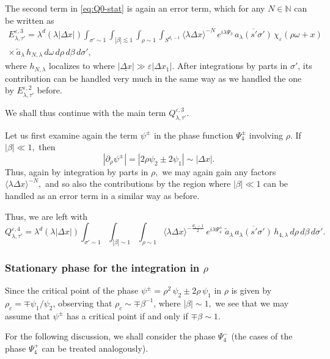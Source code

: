 \documentclass[leqno]{amsart}
\theoremstyle{definition}
\theoremstyle{remark}
\numberwithin{equation}{section}
\newcommand{\N}{\mathbb{N}}
\newcommand{\jp}[1]{\langle{#1}\rangle}
\newcommand\la{{\lambda}}
\newcommand\ve{{\varepsilon}}
\begin{document}
The second term in \eqref{eq:Q0-stat} is again an error term, which for any $N\in\N$ can be written as 
\begin{multline*}
E^{\varepsilon,3}_{\lambda,\tau'}
=\lambda^d (\la |\Delta x|) \int_{\sigma' \sim 1} \int_{|\beta|\lesssim 1} \int_{\rho \sim 1}  \int_{S^{d_1-1}} \jp{\lambda\Delta x}^{-N}\,e^{i\lambda \Psi_3}  \,\overline{a_\lambda(s'\sigma')}  \, \chi_{\varepsilon}(\rho\omega + x) \\
 \times \,\tilde a_\la\, h_{N,\lambda}\,d\omega \, d\rho  \, d\beta \, d\sigma' ,
\end{multline*}
where  $h_{N,\lambda}$ localizes to where $|\underline{\Delta x}|\gg \ve |\Delta x_1|.$ After integrations by parts in $\sigma'$, its contribution can be handled very much in the same way as we handled the one by  $E^{\varepsilon,2}_{\lambda,\tau'}$ before.

We shall thus continue with the main term $Q^{\varepsilon,3}_{\lambda,\tau'}.$

Let us first examine again  the term $\psi^\pm$  in the phase function $\Psi_ 4 ^\pm$ involving $\rho.$  If $|\beta|\ll 1,$ then
\[
|\partial_\rho\psi^{\pm}| = |2  \rho\psi_2 \pm  2\psi_1|\sim |\Delta x|. 
\]
  Thus, again by integration by parts in $\rho,$ we may again gain  any factors $ \jp{\lambda\Delta x}^{-N},$ and so also the contributions by the region where  $|\beta|\ll 1$ can be handled as an error term in a similar way as before.
 
 Thus, we are left with 
 \begin{equation*}
Q^{\varepsilon,4}_{\lambda,\tau'}=\lambda^d (\la |\Delta x|) \int_{\sigma' \sim 1} \int_{|\beta|\sim 1} \int_{\rho \sim 1} \jp{\lambda\Delta x}^{-\frac{d_1-1}2} \, e^{i\lambda \Psi_4^\pm} \, \tilde a_\la \,\overline{a_\lambda(s'\sigma')}  \, h_{4,\lambda}\, d\rho \, d\beta \, d\sigma'.
\end{equation*}




\subsubsection{Stationary phase for the integration in $\rho$}
Since the critical point of the  phase $\psi^\pm=\rho^2\, \psi_2\pm 2\rho\, \psi_1$ in $\rho$ is given by  $\rho_c = \mp \psi_1/\psi_2$,  observing that $\rho_c \sim \mp \beta^{-1}$, where $|\beta|\sim 1,$ we see that we may assume that $\psi^\pm$ has a critical point if and only if $\mp\beta \sim 1$.  

For the following discussion, we shall consider the phase  $\Psi_4^-$ (the cases of the phase  $\Psi_4^+$ can be treated analogously). 
\end{document}
